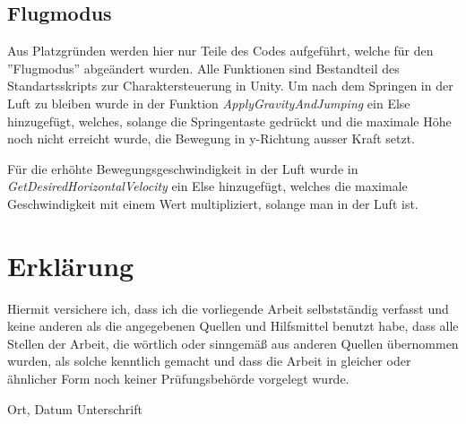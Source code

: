 \newpage
\section{Flugmodus}\label{s.flug}
Aus Platzgründen werden hier nur Teile des Codes aufgeführt, welche für den ''Flugmodus'' abgeändert wurden. Alle Funktionen sind Bestandteil des Standartsskripts zur Charaktersteuerung in Unity. 
Um nach dem Springen in der Luft zu bleiben wurde in der Funktion \textit{ApplyGravityAndJumping} ein Else hinzugefügt, welches, solange die Springentaste gedrückt und die maximale Höhe noch nicht erreicht wurde, die Bewegung in y-Richtung ausser Kraft setzt. 

\renewcommand{\baselinestretch}{1}\normalsize

\renewcommand{\baselinestretch}{1.5}\normalsize

\newpage
Für die erhöhte Bewegungsgeschwindigkeit in der Luft wurde in \textit{GetDesiredHorizontalVelocity} ein Else hinzugefügt, welches die maximale Geschwindigkeit mit einem Wert multipliziert, solange man in der Luft ist.

\renewcommand{\baselinestretch}{1}\normalsize

\renewcommand{\baselinestretch}{1.5}\normalsize





\chapter*{Erklärung}
\vspace{-20pt}
Hiermit versichere ich, dass ich die vorliegende Arbeit selbstständig verfasst und keine anderen als die angegebenen Quellen und Hilfsmittel benutzt habe, dass alle Stellen der Arbeit, die wörtlich oder sinngemäß aus anderen Quellen übernommen wurden, als solche kenntlich gemacht und dass die Arbeit in gleicher oder ähnlicher Form noch keiner Prüfungsbehörde vorgelegt wurde.

\vspace{3cm}
Ort, Datum \hspace{5cm} Unterschrift\\


